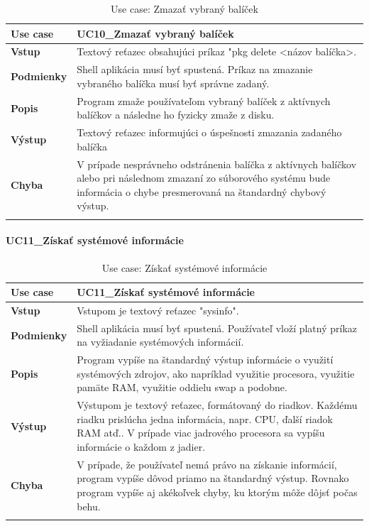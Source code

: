 {\begin{center}
\begin{longtable}{|p{2.5cm}|p{12.2cm}|}
			\hline
			\textbf{Use case} & UC10\_Zmazať vybraný balíček \\ 
			\hline
			\textbf{Vstup} & Textový reťazec obsahujúci príkaz "pkg delete <názov balíčka>.\\
			\hline
			\textbf{Podmienky} & Shell aplikácia musí byť spustená. Príkaz na zmazanie vybraného balíčka musí byť správne zadaný.\\ 
			\hline
			\textbf{Popis} & Program zmaže používateľom vybraný balíček z aktívnych balíčkov a následne ho fyzicky zmaže z disku. \\
			\hline

			\textbf{Výstup} & Textový reťazec informujúci o úspešnosti zmazania zadaného balíčka\\
			\hline
			\textbf{Chyba} & V prípade nesprávneho odstránenia balíčka z aktívnych balíčkov alebo pri následnom zmazaní zo súborového systému bude informácia o chybe presmerovaná na štandardný chybový výstup.\\
			\hline
		\caption{Use case: Zmazať vybraný balíček}
		\label{table:1}
		
	\end{longtable}
\end{center}
\paragraph{UC11\_Získať systémové informácie}
\begin{center}
	\begin{longtable}{|p{2.5cm}|p{12.2cm}|}
		
			\hline
			\textbf{Use case} & UC11\_Získať systémové informácie \\ 
			\hline
			\textbf{Vstup} & Vstupom je textový reťazec "sysinfo".\\
			\hline
			\textbf{Podmienky} & Shell aplikácia musí byť spustená. Používateľ vloží platný príkaz na vyžiadanie systémových informácií. \\ 
			\hline
			\textbf{Popis} & Program vypíše na štandardný výstup informácie o využití systémových zdrojov,  ako napríklad využitie procesora, využitie pamäte RAM, využitie oddielu swap a podobne.\\ 
			\hline
					
			\textbf{Výstup} & Výstupom je textový reťazec, formátovaný do riadkov. Každému riadku prislúcha jedna informácia, napr. CPU, ďalší riadok RAM atď.. V prípade viac jadrového procesora sa vypíšu informácie o každom z jadier.  \\
			\hline
			\textbf{Chyba} & V prípade, že používateľ nemá právo na získanie informácií, program vypíše dôvod priamo na štandardný výstup. Rovnako program vypíše aj akékoľvek chyby, ku ktorým môže dôjsť počas behu.\\
			\hline
		\caption{Use case: Získať systémové informácie}
		\label{table:1}
		

\end{longtable}
\end{center}}
